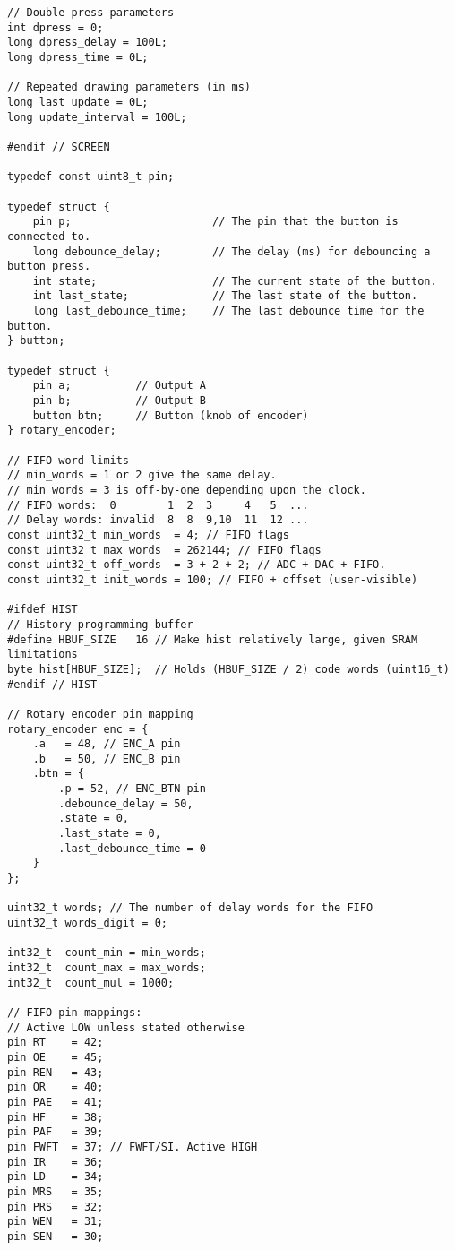 \documentclass[11pt,letterpaper]{article}
\begin{document}
\begin{verbatim}
// Double-press parameters
int dpress = 0;
long dpress_delay = 100L;
long dpress_time = 0L;

// Repeated drawing parameters (in ms)
long last_update = 0L;
long update_interval = 100L; 

#endif // SCREEN

typedef const uint8_t pin;

typedef struct {
    pin p;                      // The pin that the button is connected to.
    long debounce_delay;        // The delay (ms) for debouncing a button press.
    int state;                  // The current state of the button.
    int last_state;             // The last state of the button.
    long last_debounce_time;    // The last debounce time for the button.
} button;

typedef struct {
    pin a;          // Output A
    pin b;          // Output B
    button btn;     // Button (knob of encoder)
} rotary_encoder;

// FIFO word limits
// min_words = 1 or 2 give the same delay.
// min_words = 3 is off-by-one depending upon the clock.
// FIFO words:  0        1  2  3     4   5  ...
// Delay words: invalid  8  8  9,10  11  12 ...
const uint32_t min_words  = 4; // FIFO flags
const uint32_t max_words  = 262144; // FIFO flags
const uint32_t off_words  = 3 + 2 + 2; // ADC + DAC + FIFO.
const uint32_t init_words = 100; // FIFO + offset (user-visible)

#ifdef HIST
// History programming buffer
#define HBUF_SIZE   16 // Make hist relatively large, given SRAM limitations
byte hist[HBUF_SIZE];  // Holds (HBUF_SIZE / 2) code words (uint16_t)
#endif // HIST

// Rotary encoder pin mapping
rotary_encoder enc = {
    .a   = 48, // ENC_A pin
    .b   = 50, // ENC_B pin
    .btn = {
        .p = 52, // ENC_BTN pin
        .debounce_delay = 50,
        .state = 0,
        .last_state = 0,
        .last_debounce_time = 0
    }
};

uint32_t words; // The number of delay words for the FIFO
uint32_t words_digit = 0;

int32_t  count_min = min_words;
int32_t  count_max = max_words;
int32_t  count_mul = 1000;

// FIFO pin mappings:
// Active LOW unless stated otherwise
pin RT    = 42;
pin OE    = 45;
pin REN   = 43;
pin OR    = 40;
pin PAE   = 41;
pin HF    = 38;
pin PAF   = 39;
pin FWFT  = 37; // FWFT/SI. Active HIGH
pin IR    = 36;
pin LD    = 34;
pin MRS   = 35;
pin PRS   = 32;
pin WEN   = 31;
pin SEN   = 30;


\end{verbatim}
\end{document}
